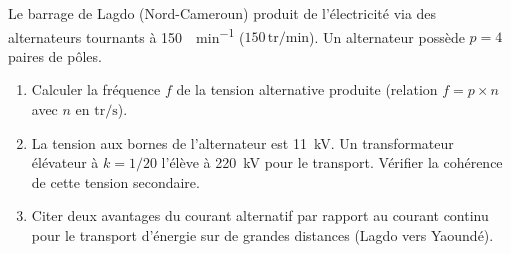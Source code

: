\documentclass[11pt]{article}
\begin{document}
\begin{exercice}
Le barrage de Lagdo (Nord-Cameroun) produit de l'électricité via des alternateurs tournants à \SI{150}{\tr\per\minute} ($150\,\text{tr/min}$). Un alternateur possède $p = 4$ paires de pôles.
\begin{enumerate}
    \item Calculer la fréquence $f$ de la tension alternative produite (relation $f = p \times n$ avec $n$ en $\text{tr/s}$). 
    \item La tension aux bornes de l'alternateur est \SI{11}{\kilo\volt}. Un transformateur élévateur à $k = 1/20$ l'élève à \SI{220}{\kilo\volt} pour le transport. Vérifier la cohérence de cette tension secondaire. 
    \item Citer deux avantages du courant alternatif par rapport au courant continu pour le transport d'énergie sur de grandes distances (Lagdo vers Yaoundé).
\end{enumerate}
\end{exercice}
\end{document}
